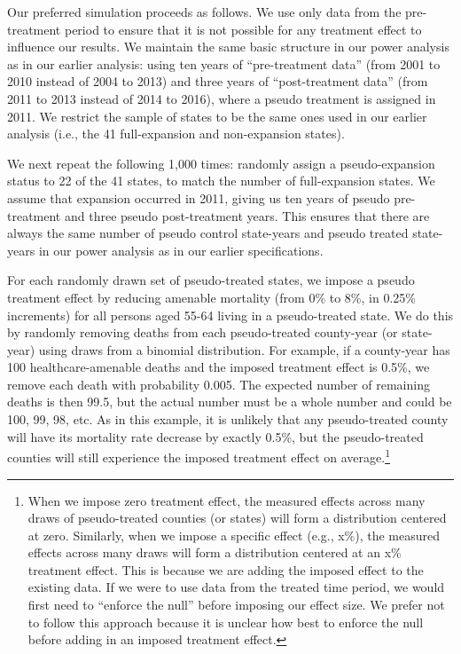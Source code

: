 \documentclass[12pt]{article}%
\begin{document}
Our preferred simulation proceeds as follows. 
We use only data from the pre-treatment period to ensure that it is not possible for any treatment effect to influence our results. 
We maintain the same basic structure in our power analysis as in our earlier analysis: using ten years of ``pre-treatment data'' (from 2001 to 2010 instead of 2004 to 2013) and three years of ``post-treatment data'' (from 2011 to 2013 instead of 2014 to 2016), where a pseudo treatment is assigned in 2011. 
We restrict the sample of states to be the same ones used in our earlier analysis (i.e., the 41 full-expansion and non-expansion states). 

We next repeat the following 1,000 times: randomly assign a pseudo-expansion status to 22 of the 41 states, to match the number of full-expansion states. 
We assume that expansion occurred in 2011, giving us ten years of pseudo pre-treatment and three pseudo post-treatment years. 
This ensures that there are always the same number of pseudo control state-years and pseudo treated state-years in our power analysis as in our earlier specifications. 

For each randomly drawn set of pseudo-treated states, we impose a pseudo treatment effect by reducing amenable mortality (from 0\% to 8\%, in 0.25\% increments) for all persons aged 55-64 living in a pseudo-treated state.  
We do this by randomly removing deaths from each pseudo-treated county-year (or state-year) using draws from a binomial distribution.  
For example, if a county-year has 100 healthcare-amenable deaths and the imposed treatment effect is 0.5\%, we remove each death with probability 0.005.  
The expected number of remaining deaths is then 99.5, but the actual number must be a whole number and could be 100, 99, 98, etc.  
As in this example, it is unlikely that any pseudo-treated county will have its mortality rate decrease by exactly 0.5\%, but the pseudo-treated counties will still experience the imposed treatment effect on average.\footnote{When we impose zero treatment effect, the measured effects across many draws of pseudo-treated counties (or states) will form a distribution centered at zero. Similarly, when we impose a specific effect (e.g., x\%), the measured effects across many draws will form a distribution centered at an x\% treatment effect. This is because we are adding the imposed effect to the existing data. If we were to use data from the treated time period, we would first need to ``enforce the null'' before imposing our effect size. We prefer not to follow this approach because it is unclear how best to enforce the null before adding in an imposed treatment effect.}
\end{document}

